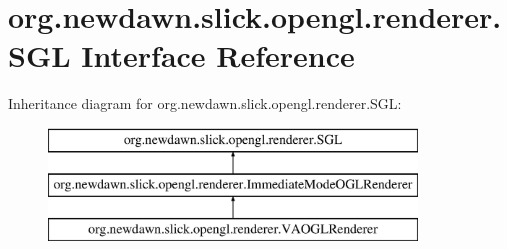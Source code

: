 \hypertarget{interfaceorg_1_1newdawn_1_1slick_1_1opengl_1_1renderer_1_1_s_g_l}{}\section{org.\+newdawn.\+slick.\+opengl.\+renderer.\+S\+GL Interface Reference}
\label{interfaceorg_1_1newdawn_1_1slick_1_1opengl_1_1renderer_1_1_s_g_l}
Inheritance diagram for org.\+newdawn.\+slick.\+opengl.\+renderer.\+S\+GL\+:\begin{figure}[H]
\begin{center}
\leavevmode
\includegraphics[height=3.000000cm]{interfaceorg_1_1newdawn_1_1slick_1_1opengl_1_1renderer_1_1_s_g_l}
\end{center}
\end{figure}
